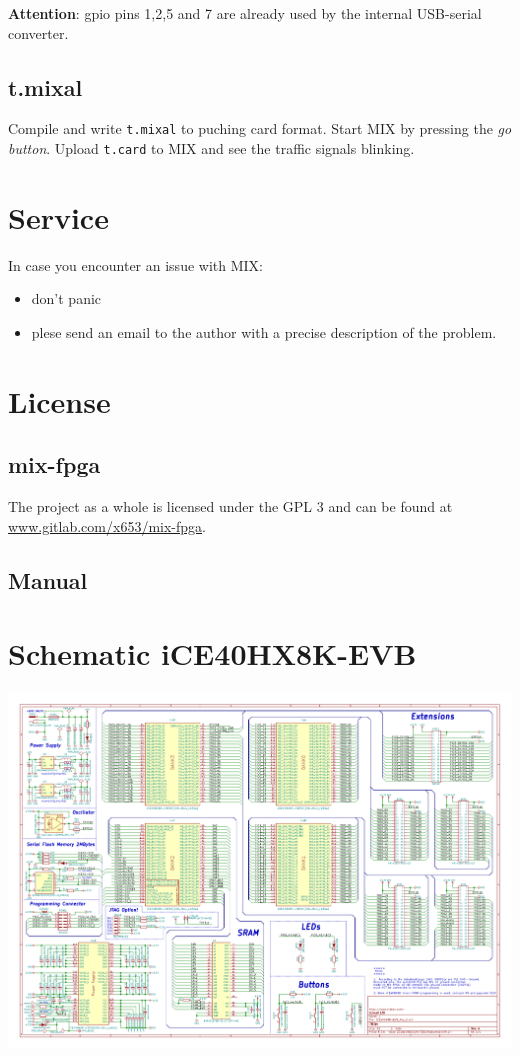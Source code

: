 \documentclass[a4paper,ngerman]{scrartcl}
\begin{document}
\textbf{Attention}: gpio pins 1,2,5 and 7 are already used by the internal USB-serial converter.


\subsection{t.mixal}
Compile and write \lstinline|t.mixal| to puching card format. Start MIX by pressing the \textit{go button}. Upload \lstinline|t.card| to MIX and see the traffic signals blinking.


\section{Service}
In case you encounter an issue with MIX:
\begin{itemize}
	\item don't panic
	\item plese send an email to the author with a precise description of the problem.
\end{itemize}

\section{License}

\subsection{mix-fpga}
The project as a whole is licensed under the GPL 3 and can be found at \href{www.gitlab.com/x653/mix-fpga}{www.gitlab.com/x653/mix-fpga}.
\subsection{Manual}
\doclicenseThis

\newpage

\appendix

\section{Schematic iCE40HX8K-EVB}
\label{sec:schematic}
\includegraphics[angle=90,scale=0.8]{../iCE40HX8K-EVB.pdf}
\end{document}
